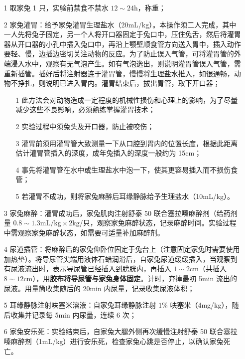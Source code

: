 \documentclass[UTF8]{ctexart}
\begin{document}
\begin{itemize}
    \item [1] 取家兔 1 只，实验前禁食不禁水 $12\sim 24\text{h}$，称重；
    \item [2] 家兔灌胃：给予家兔灌胃生理盐水（20mL/kg）。本操作须二人完成，其中一人先将兔子固定，另一个人将开口器固定于兔口中，压住兔舌，然后将灌胃器从开口器的小孔中插入兔口中，再沿上颚壁顺食管方向送入胃中，插入动作要轻、慢，边插边密切关注动物的反应。为了防止误入气管，可将灌胃管的外端浸入水中，观察有无气泡产生。如有气泡逸出，则说明灌胃管误入气管，需重新插管。插好后将注射器连于灌胃管，慢慢将生理盐水推入，如很通畅，动物不挣扎，则说明已进入胃内。灌胃结束后，拔出胃管，取下开口器；

        \begin{itemize}
            \item [1] 此方法会对动物造成一定程度的机械性损伤和心理上的影响，为了尽量减少这些不良影响，必须熟练掌握灌胃技术；
            \item [2] 实验过程中须兔头及开口器，防止被咬伤；
            \item [3] 灌胃前须用灌胃管大致测量一下从口腔到胃内的位置长度，根据此距离估计灌胃管插入的深度，成年兔插入的深度一般约为 15cm；
            \item [4] 事先将灌胃管在水中或生理盐水中泡一下，使其更容易插入而不损伤食管；
            \item [5] 若灌胃不成功，则将家兔麻醉后耳缘静脉给予生理盐水（10mL/kg）。
        \end{itemize}

    \item [3] 家兔麻醉：灌胃成功后，家兔肌肉注射舒泰 50 联合塞拉嗪麻醉剂（给药剂量 $0.8\sim 1.3\text{mL}/\text{kg}\times 2\text{kg}$/只，观察家兔麻醉状态，记录麻醉时间。实验过程中需观察家兔麻醉状态，如需要可适量补加麻醉剂。
    \item [4] 尿道插管：将麻醉后的家兔仰卧位固定于兔台上（注意固定家兔时需要使用加热垫）。将导尿管尖端用液体石蜡润滑后，自家兔尿道缓缓插入，当观察到有尿液流出时，表示导尿管已经插入到膀胱内，再插入 $1\sim 2\text{cm}$（共插入 $8\sim 12\text{cm}$），用\textbf{胶布将导尿管与家兔身体固定}。计时，弃掉最初 5min 流出的尿液。用量筒收集随后的 20min 内尿量，记录收集尿液体积；
    \item [5] 耳缘静脉注射呋塞米溶液：自家兔耳缘静脉注射 $1\%$ 呋塞米（4mg/kg），随后收集并记录每 5min 内尿量，连续 6 次；
    \item [6] 家兔安乐死：实验结束后，自家兔大腿外侧再次缓慢注射舒泰 50 联合塞拉嗪麻醉剂（1mL/kg）进行安乐死，检查家兔心跳是否停止，以确认家兔死亡。
\end{itemize}
\end{document}
